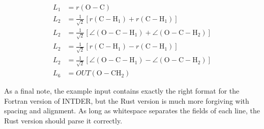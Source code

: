 \documentclass{article}
\begin{document}
\begin{align}
  L_1 &= r(\text{O}-\text{C}) \\
  L_2 &= \frac{1}{\sqrt{2}}[r(\text{C}-\text{H}_1) + r(\text{C}-\text{H}_1)]\\
  L_2 &= \frac{1}{\sqrt{2}}[\angle(\text{O}-\text{C}-\text{H}_1) + \angle(\text{O}-\text{C}-\text{H}_2)]\\
  L_2 &= \frac{1}{\sqrt{2}}[r(\text{C}-\text{H}_1) - r(\text{C}-\text{H}_1)]\\
  L_2 &= \frac{1}{\sqrt{2}}[\angle(\text{O}-\text{C}-\text{H}_1) - \angle(\text{O}-\text{C}-\text{H}_2)]\\
  L_6 &= OUT(\text{O}-\text{CH}_2)
\end{align}

As a final note, the example input contains exactly the right format for the
Fortran version of INTDER, but the Rust version is much more forgiving with
spacing and alignment. As long as whitespace separates the fields of each line,
the Rust version should parse it correctly.
\end{document}
